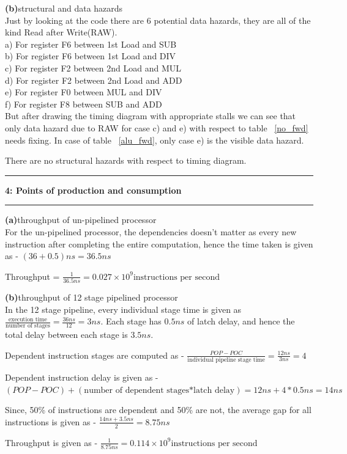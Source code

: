 \documentclass[11pt]{article}
\newcommand\question[2]{\vspace{.25in}\hrule\textbf{#1: #2}\vspace{.5em}\hrule\vspace{.10in}}
\renewcommand\part[1]{\vspace{.10in}\textbf{(#1)}}
\begin{document}
\part{b}{structural and data hazards}\\
Just by looking at the code there are 6 potential data hazards, they are all of the kind Read after Write(RAW).\\
a) For register F6 between 1st Load and SUB\\
b) For register F6 between 1st Load and DIV\\
c) For register F2 between 2nd Load and MUL\\
d) For register F2 between 2nd Load and ADD\\
e) For register F0 between MUL and DIV\\
f) For register F8 between SUB and ADD\\
But after drawing the timing diagram with appropriate stalls we can see that only data hazard due to RAW for case c) and e) with respect to table ~\ref{no_fwd} needs fixing. In case of table ~\ref{alu_fwd}, only case e) is the visible data hazard.

There are no structural hazards with respect to timing diagram.

\question{4}{Points of production and consumption}
\part{a}{throughput of un-pipelined processor}\\
For the un-pipelined processor, the dependencies doesn't matter as every new instruction after completing the entire computation, hence the time taken is given as  - $(36+0.5)ns = 36.5ns$

Throughput = $\frac{1}{36.5ns} = 0.027\times 10^9 \text{instructions per second}$

\part{b}{throughput of 12 stage pipelined processor}\\

In the 12 stage pipeline, every individual stage time is given as $\frac{\text{execution time}}{\text{number of stages}} = \frac{36ns}{12} = 3ns$.
Each stage has $0.5ns$ of latch delay, and hence the total delay between each stage is $3.5ns$. 

Dependent instruction stages are computed as - $\frac{POP-POC}{\text{individual pipeline stage time}}=\frac{12ns}{3ns}=4$

Dependent instruction delay is given as - $(POP-POC)+(\text{number of dependent stages*latch delay}) = 12ns + 4*0.5ns=14ns$

Since, 50\% of instructions are dependent and 50\% are not, the average gap for all instructions is given as - $\frac{14ns+3.5ns}{2} = 8.75ns$

Throughput is given as - $\frac{1}{8.75ns}=0.114\times 10^9 \text{instructions per second}$
\end{document}
